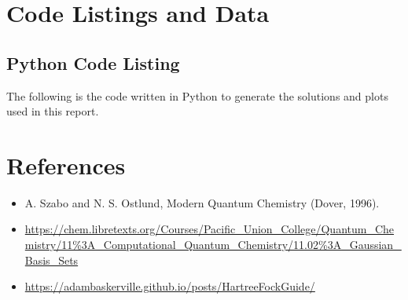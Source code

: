 \documentclass[10pt, oneside, letterpaper]{article}
\begin{document}
\newpage
\section{Code Listings and Data}

\subsection{Python Code Listing}
\label{code-listing-python}
The following is the code written in Python to generate the solutions and plots used in this report.
% 

\newpage
\section{References}

\begin{itemize}
  \item A. Szabo and N. S. Ostlund, Modern Quantum Chemistry (Dover, 1996).
  \item \url{https://chem.libretexts.org/Courses/Pacific_Union_College/Quantum_Chemistry/11%3A_Computational_Quantum_Chemistry/11.02%3A_Gaussian_Basis_Sets} %
  \item \url{https://adambaskerville.github.io/posts/HartreeFockGuide/}
\end{itemize}
\end{document}
